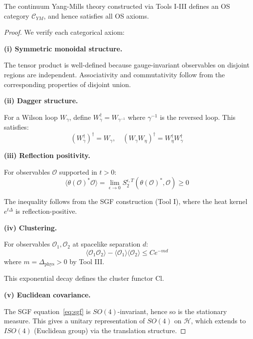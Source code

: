 \begin{theorem}
\label{thm:ym-os}
The continuum Yang-Mills theory constructed via Tools I-III defines an 
OS category $\mathcal{C}_{YM}$, and hence satisfies all OS axioms.
\end{theorem}

\begin{proof}
We verify each categorical axiom:

\textbf{(i) Symmetric monoidal structure.}

The tensor product is well-defined because gauge-invariant observables on 
disjoint regions are independent. Associativity and commutativity follow 
from the corresponding properties of disjoint union.

\textbf{(ii) Dagger structure.}

For a Wilson loop $W_\gamma$, define $W_\gamma^\dagger = W_{\gamma^{-1}}$ 
where $\gamma^{-1}$ is the reversed loop. This satisfies:
\[
(W_\gamma^\dagger)^\dagger = W_\gamma, \quad (W_\gamma W_\eta)^\dagger = W_\eta^\dagger W_\gamma^\dagger
\]

\textbf{(iii) Reflection positivity.}

For observables $\mathcal{O}$ supported in $t > 0$:
\[
\langle \theta(\mathcal{O})^* \mathcal{O} \rangle = \lim_{\epsilon \to 0} S_2^{\epsilon,T}(\theta(\mathcal{O})^*, \mathcal{O}) \geq 0
\]

The inequality follows from the SGF construction (Tool I), where the heat kernel 
$e^{t\Delta}$ is reflection-positive.

\textbf{(iv) Clustering.}

For observables $\mathcal{O}_1, \mathcal{O}_2$ at spacelike separation $d$:
\[
\langle \mathcal{O}_1 \mathcal{O}_2 \rangle - \langle \mathcal{O}_1 \rangle \langle \mathcal{O}_2 \rangle 
\leq C e^{-m d}
\]
where $m = \Delta_{\text{phys}} > 0$ by Tool III.

This exponential decay defines the cluster functor $\text{Cl}$.

\textbf{(v) Euclidean covariance.}

The SGF equation~\eqref{eq:sgf} is $SO(4)$-invariant, hence so is the 
stationary measure. This gives a unitary representation of $SO(4)$ on 
$\mathcal{H}$, which extends to $ISO(4)$ (Euclidean group) via the 
translation structure.
\end{proof}

